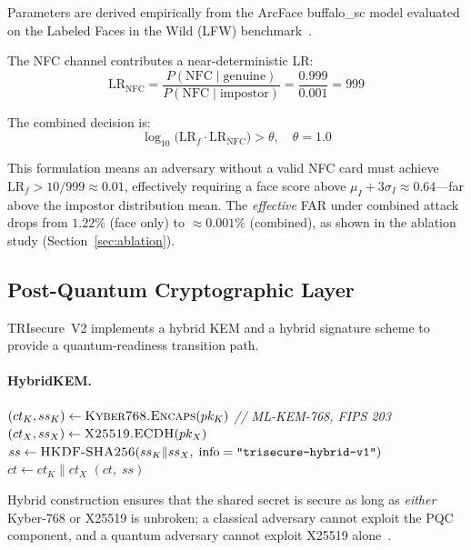 \documentclass[preprint,12pt]{elsarticle}
\begin{document}
Parameters are derived empirically from the ArcFace buffalo\_sc model
evaluated on the Labeled Faces in the Wild (LFW) benchmark~\cite{deng2019arcface}.

The NFC channel contributes a near-deterministic LR:
\begin{equation}
  \mathrm{LR}_{\mathrm{NFC}} = \frac{P(\mathrm{NFC}\mid\text{genuine})}{P(\mathrm{NFC}\mid\text{impostor})} = \frac{0.999}{0.001} = 999
\end{equation}

The combined decision is:
\begin{equation}
  \log_{10}\!\bigl(\mathrm{LR}_f \cdot \mathrm{LR}_{\mathrm{NFC}}\bigr) > \theta, \quad \theta = 1.0
\end{equation}

This formulation means an adversary without a valid NFC card must achieve
$\mathrm{LR}_f > 10 / 999 \approx 0.01$, effectively requiring a
face score above $\mu_I + 3\sigma_I \approx 0.64$—far above the
impostor distribution mean. The \emph{effective} FAR under combined
attack drops from $1.22\%$ (face only) to $\approx 0.001\%$ (combined),
as shown in the ablation study (Section~\ref{sec:ablation}).

\subsection{Post-Quantum Cryptographic Layer}
\label{sec:pqc}

TRIsecure~V2 implements a hybrid KEM and a hybrid signature scheme to
provide a quantum-readiness transition path.

\paragraph{HybridKEM.}

\begin{algorithm}[H]
\caption{TRIsecure HybridKEM.Encapsulate($pk$)}
\begin{algorithmic}[1]
  \State $(ct_K, ss_K) \gets \textsc{Kyber768.Encaps}(pk_K)$ \quad \textit{// ML-KEM-768, FIPS 203}
  \State $(ct_X, ss_X) \gets \textsc{X25519.ECDH}(pk_X)$
  \State $ss \gets \textsc{HKDF-SHA256}(ss_K \| ss_X,\; \text{info}=\texttt{"trisecure-hybrid-v1"})$
  \State $ct \gets ct_K \| ct_X$
  \State \Return $(ct,\; ss)$
\end{algorithmic}
\end{algorithm}

Hybrid construction ensures that the shared secret is secure as long as
\emph{either} Kyber-768 or X25519 is unbroken; a classical adversary
cannot exploit the PQC component, and a quantum adversary cannot exploit
X25519 alone~\cite{bernstein2017post}.
\end{document}
